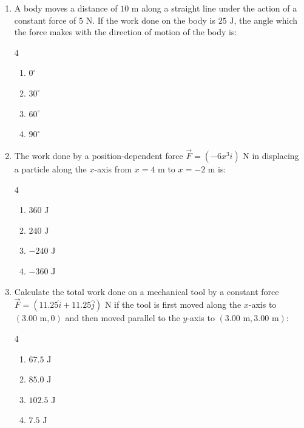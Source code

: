 \documentclass[11pt,a4paper]{article}
\begin{document}
\begin{enumerate}[label=\textbf{\arabic*.},leftmargin=18pt,itemsep=8pt]

  \item A body moves a distance of $10\text{ m}$ along a straight line under the action of a constant force of $5\text{ N}$. If the work done on the body is $25\text{ J}$, the angle which the force makes with the direction of motion of the body is:
  \begin{multicols}{4}
    \begin{enumerate}[label=(\Alph*)]
      \item $0^\circ$
      \item $30^\circ$
      \item $60^\circ$
      \item $90^\circ$
    \end{enumerate}
  \end{multicols}

  \item The work done by a position-dependent force $\vec{F} = (-6x^3\hat{i})\text{ N}$ in displacing a particle along the $x$-axis from $x = 4\text{ m}$ to $x = -2\text{ m}$ is:
  \begin{multicols}{4}
    \begin{enumerate}[label=(\Alph*)]
      \item $360\text{ J}$
      \item $240\text{ J}$
      \item $-240\text{ J}$
      \item $-360\text{ J}$
    \end{enumerate}
  \end{multicols}

  \item Calculate the total work done on a mechanical tool by a constant force $\vec{F} = (11.25\hat{i} + 11.25\hat{j})\text{ N}$ if the tool is first moved along the $x$-axis to $(3.00\text{ m}, 0)$ and then moved parallel to the $y$-axis to $(3.00\text{ m}, 3.00\text{ m})$:
  \begin{multicols}{4}
    \begin{enumerate}[label=(\Alph*)]
      \item $67.5\text{ J}$
      \item $85.0\text{ J}$
      \item $102.5\text{ J}$
      \item $7.5\text{ J}$
    \end{enumerate}
  \end{multicols}


\end{enumerate}
\end{document}
